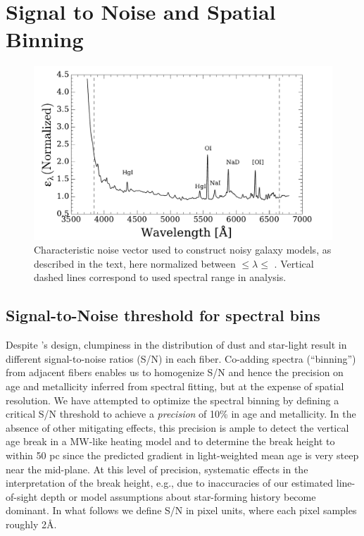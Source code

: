 \section{Signal to Noise and Spatial Binning}
\label{891_1:sec:maps}

\begin{figure}
  \centering
  \includegraphics[width=\columnwidth]{891_1/figs/noise_vec.pdf}
  \caption[Characteristic noise
  spectrum]{\label{891_1:fig:noise_vec}\fixspacing Characteristic noise
    vector used to construct noisy galaxy models, as described in the
    text, here normalized between  $\leq \lambda \leq$
    . Vertical dashed lines correspond to used spectral
    range in analysis.}
\end{figure}

\subsection{Signal-to-Noise threshold for spectral bins}
\label{891_1:sec:snr_threshold}

Despite \GP's design, clumpiness in the distribution of dust and
star-light result in different signal-to-noise ratios (S/N) in each
fiber. Co-adding spectra (``binning'') from adjacent fibers enables us
to homogenize S/N and hence the precision on age and metallicity
inferred from spectral fitting, but at the expense of spatial
resolution. We have attempted to optimize the spectral binning by
defining a critical S/N threshold to achieve a {\it precision} of 10\%
in age and metallicity. In the absence of other mitigating effects,
this precision is ample to detect the vertical age break in a MW-like
heating model and to determine the break height to within 50 pc since
the predicted gradient in light-weighted mean age is very steep near
the mid-plane. At this level of precision, systematic effects in the
interpretation of the break height, e.g., due to inaccuracies of our
estimated line-of-sight depth or model assumptions about star-forming
history become dominant. In what follows we define S/N in pixel units,
where each pixel samples roughly 2\AA.

